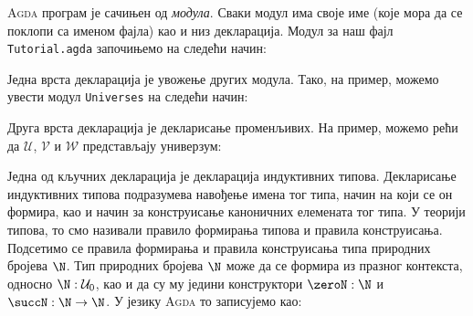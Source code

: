 \textsc{Agda} програм је сачињен од \emph{модула}. Сваки модул има своје име (које мора да се поклопи са именом фајла) као и низ декларација. Модул за наш фајл \texttt{Tutorial.agda} започињемо на следећи начин:
\begin{code}%
\>[0]\AgdaSpace{}%
\AgdaSpace{}%
\<%
\end{code}

Једна врста декларација је увожење других модула. Тако, на пример, можемо увести модул \texttt{Universes} на следећи начин: 
\begin{code}%
\>[0]\AgdaSpace{}%
\AgdaSpace{}%
\AgdaSpace{}%
\<%
\end{code}

Друга врста декларација је декларисање променљивих. На пример, можемо рећи да $\mathcal{U}$, $\mathcal{V}$ и $\mathcal{W}$ представљају универзум:
\begin{code}%
\>[0]\AgdaSpace{}%
\AgdaSpace{}%
\AgdaSpace{}%
\AgdaSpace{}%
\AgdaSymbol{:}\AgdaSpace{}%
\<%
\end{code}

Једна од кључних декларација је декларација индуктивних типова. Декларисање индуктивних типова подразумева навођење имена тог типа, начин на који се он формира, као и начин за конструисање каноничних елемената тог типа. У теорији типова, то смо називали правило формирања типова и правила конструисања. Подсетимо се правила формирања и правила конструисања типа природних бројева $\N$. Тип природних бројева $\N$ може да се формира из празног контекста, односно $\N : \mathcal{U}_0$, као и да су му једини конструктори $\zeroN : \N$ и $\succN : \N \to \N$. У језику \textsc{Agda} то записујемо као: 
\begin{code}%
\>[0]\AgdaSpace{}%
\AgdaSpace{}%
\AgdaSymbol{:}\AgdaSpace{}%
\AgdaSpace{}%
\AgdaSpace{}%
\<%
\\
\>[0][@{}l@{\AgdaIndent{0}}]%
\>[4]\AgdaSpace{}%
\AgdaSymbol{:}\AgdaSpace{}%
\<%
\\
%
\>[4]\AgdaSpace{}%
\AgdaSymbol{:}\AgdaSpace{}%
\AgdaSpace{}%
\AgdaSpace{}%
\<%
\\
\>[0]\<%
\\
\>[0]\AgdaSymbol{\{-\#}\AgdaSpace{}%
\AgdaSpace{}%
\AgdaSpace{}%
\AgdaSpace{}%
\AgdaSymbol{\#-\}}\<%
\end{code}

